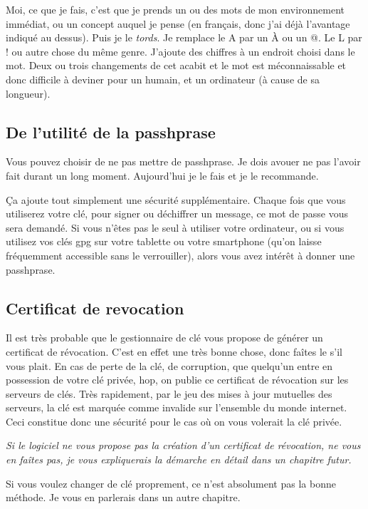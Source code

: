 Moi, ce que je fais, c'est que je prends un ou des mots de mon
environnement immédiat, ou un concept auquel je pense (en français, donc
j'ai déjà l'avantage indiqué au dessus). Puis je le \emph{tords}. Je
remplace le A par un À ou un @. Le L par ! ou autre chose du même genre.
J'ajoute des chiffres à un endroit choisi dans le mot. Deux ou trois changements de cet acabit et le mot est méconnaissable et
donc difficile à deviner pour un humain, et un ordinateur (à cause de sa
longueur).

\subsection{De l'utilité de la passhprase}\label{de-lutilituxe9-de-la-passhprase}

Vous pouvez choisir de ne pas mettre de passhprase. Je dois avouer ne
pas l'avoir fait durant un long moment. Aujourd'hui je le fais et je le
recommande.

Ça ajoute tout simplement une sécurité supplémentaire. Chaque fois que
vous utiliserez votre clé, pour signer ou déchiffrer un message, ce mot
de passe vous sera demandé. Si vous n'êtes pas le seul à utiliser votre
ordinateur, ou si vous utilisez vos clés gpg sur votre tablette ou votre
smartphone (qu'on laisse fréquemment accessible sans le verrouiller),
alors vous avez intérêt à donner une passhprase.

\subsection{Certificat de revocation}\label{certificat-de-revocation}

Il est très probable que le gestionnaire de clé vous propose de générer
un certificat de révocation. C'est en effet une très bonne chose, donc
faîtes le s'il vous plait. En cas de perte de la clé, de corruption, que quelqu'un entre en
possession de votre clé privée, hop, on publie ce certificat de
révocation sur les serveurs de clés. Très rapidement, par le jeu des
mises à jour mutuelles des serveurs, la clé est marquée comme invalide
sur l'ensemble du monde internet. Ceci constitue donc une sécurité pour le cas où on vous volerait la clé
privée.

\emph{Si le logiciel ne vous propose pas la création d'un certificat de
révocation, ne vous en faîtes pas, je vous expliquerais la démarche en
détail dans un chapitre futur.}

Si vous voulez changer de clé proprement, ce n'est absolument pas la
bonne méthode. Je vous en parlerais dans un autre chapitre.

